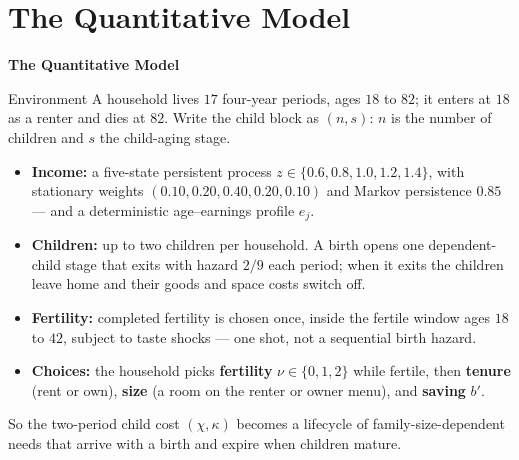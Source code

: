 \documentclass[aspectratio=169,10pt]{beamer}
\providecommand{\1}{\mathbf 1}
\begin{document}
\section{The Quantitative Model}

\begin{frame}
  \vfill
  \begin{center}
    \Large\textbf{The Quantitative Model}
  \end{center}
  \vfill
\end{frame}

\begin{frame}{Environment}
  A household lives $17$ four-year periods, ages $18$ to $82$; it enters at $18$ as a renter and dies at $82$. Write the child block as $(n,s)$: $n$ is the number of children and $s$ the child-aging stage.
  \begin{itemize}
    \item \textbf{Income:} a five-state persistent process $z\in\{0.6,0.8,1.0,1.2,1.4\}$, with stationary weights $(0.10,0.20,0.40,0.20,0.10)$ and Markov persistence $0.85$ --- and a deterministic age--earnings profile $e_j$.
    \item \textbf{Children:} up to two children per household. A birth opens one dependent-child stage that exits with hazard $2/9$ each period; when it exits the children leave home and their goods and space costs switch off.
    \item \textbf{Fertility:} completed fertility is chosen once, inside the fertile window ages $18$ to $42$, subject to taste shocks --- one shot, not a sequential birth hazard.
    \item \textbf{Choices:} the household picks \textbf{fertility} $\nu\in\{0,1,2\}$ while fertile, then \textbf{tenure} (rent or own), \textbf{size} (a room on the renter or owner menu), and \textbf{saving} $b'$.
  \end{itemize}
  So the two-period child cost $(\chi,\kappa)$ becomes a lifecycle of family-size-dependent needs that arrive with a birth and expire when children mature.
\end{frame}
\end{document}
